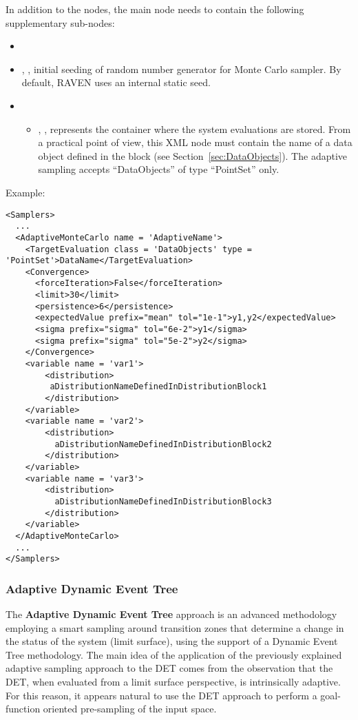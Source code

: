  In addition to the  nodes, the main
 node needs to contain the following supplementary
sub-nodes:

\begin{itemize}
  \item \convergenceDescriptionAMC
  \item {}, ,
  initial seeding of random number generator for Monte Carlo sampler. By default, RAVEN uses an internal static seed.
  \item {}
    \begin{itemize}
      \item {}, ,
        represents the container where the system evaluations are stored.
        From a practical point of view, this XML node must contain the name of
        a data object defined in the  block (see
        Section~\ref{sec:DataObjects}).
        The adaptive sampling accepts ``DataObjects'' of type
        ``PointSet'' only.
    \end{itemize}
\end{itemize}


Example:
\begin{lstlisting}[style=XML]
<Samplers>
  ...
  <AdaptiveMonteCarlo name = 'AdaptiveName'>
    <TargetEvaluation class = 'DataObjects' type = 'PointSet'>DataName</TargetEvaluation>
    <Convergence>
      <forceIteration>False</forceIteration>
      <limit>30</limit>
      <persistence>6</persistence>
      <expectedValue prefix="mean" tol="1e-1">y1,y2</expectedValue>
      <sigma prefix="sigma" tol="6e-2">y1</sigma>
      <sigma prefix="sigma" tol="5e-2">y2</sigma>
    </Convergence>
    <variable name = 'var1'>
        <distribution>
         aDistributionNameDefinedInDistributionBlock1
        </distribution>
    </variable>
    <variable name = 'var2'>
        <distribution>
          aDistributionNameDefinedInDistributionBlock2
        </distribution>
    </variable>
    <variable name = 'var3'>
        <distribution>
          aDistributionNameDefinedInDistributionBlock3
        </distribution>
    </variable>
  </AdaptiveMonteCarlo>
  ...
</Samplers>
\end{lstlisting}

\subsubsection{Adaptive Dynamic Event Tree}
\label{subsubsubsec:ADET}
The \textbf{Adaptive Dynamic Event Tree} approach is an advanced methodology
employing a smart sampling around transition zones that determine a change in
the status of the system (limit surface), using the support of a Dynamic Event
Tree methodology.
%
The main idea of the application of the previously explained adaptive sampling
approach to the DET comes from the observation that the DET, when evaluated from
a limit surface perspective, is intrinsically adaptive.
%
For this reason, it appears natural to use the DET approach to perform a
goal-function oriented pre-sampling of the input space.

